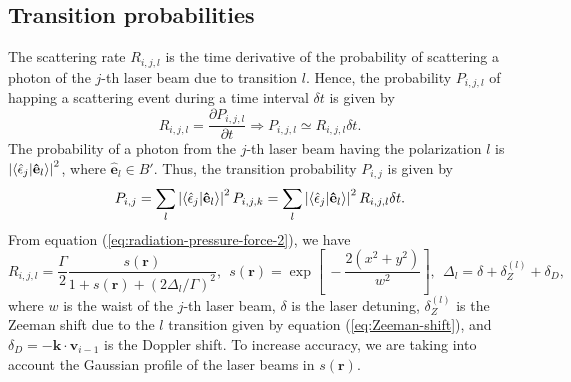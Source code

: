 \subsection{Transition probabilities}
\label{sec:transition-probabilities}

The scattering rate $ R_{i,j,l} $ is the time derivative of the probability of scattering a photon of the $j$-th laser beam due to transition $ l $. Hence, the probability $ P_{i,j,l} $ of happing a scattering event during a time interval $ \delta t $ is given by
\begin{equation}
    R_{i,j,l} = \frac{\partial P_{i,j,l}}{\partial t} \Rightarrow P_{i,j,l} \simeq R_{i,j,l} \delta t.
\end{equation}
The probability of a photon from the $j$-th laser beam having the polarization $ l $ is $ \left| \braket{\hat{\epsilon}_j|\mathbf{\hat{e}}_l} \right|^2 $, where $ \mathbf{\hat{e}}_l \in B' $. Thus, the transition probability $ P_{i,j} $ is given by
\begin{equation}
    P_{i,j} = \sum_{l} \left| \braket{\hat{\epsilon}_j|\mathbf{\hat{e}}_l} \right|^2 P_{i,j,k} =  \sum_{l} \left| \braket{\hat{\epsilon}_j|\mathbf{\hat{e}}_l} \right|^2 R_{i,j,l} \delta t.
    \label{eq:transition-probabilities}
\end{equation}
From equation (\ref{eq:radiation-pressure-force-2}), we have
\begin{equation}
    R_{i,j,l} = \frac{\Gamma}{2}\frac{s(\mathbf{r})}{1 + s(\mathbf{r}) + (2\Delta_l / \Gamma)^2},\ \ s(\mathbf{r}) = \exp\left[\ -\frac{2(x^2 + y^2)}{w^2} \right],\ \ \Delta_l = \delta + \delta_Z^{(l)} + \delta_D,
    \label{eq:scattering-rate-each-transition}
\end{equation}
where $ w $ is the waist of the $ j $-th laser beam, $ \delta $ is the laser detuning, $ \delta_Z^{(l)} $ is the Zeeman shift due to the $ l $ transition given by equation (\ref{eq:Zeeman-shift}), and $ \delta_D = - \mathbf{k} \cdot \mathbf{v}_{i - 1} $ is the Doppler shift. To increase accuracy, we are taking into account the Gaussian profile of the laser beams in $ s(\mathbf{r}) $.

